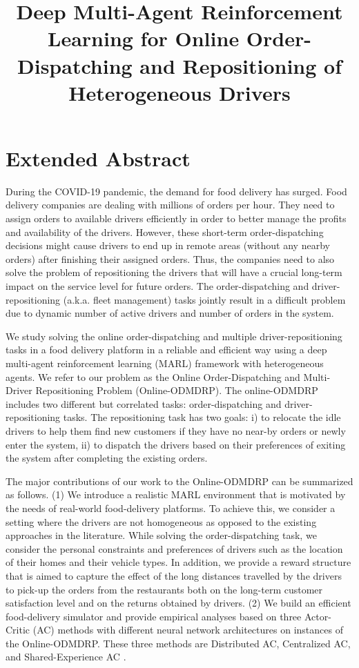 \documentclass{article}
\title{Deep Multi-Agent Reinforcement Learning for Online Order-Dispatching and Repositioning of Heterogeneous Drivers}
\author{\rule{0in}{0pt}
\textbf{Ilgin Dogan}* \hskip 2em \textbf{Yiduo Huang}* \\
University of California, Berkeley\\
* All authors contributed equally. }
\theoremstyle{defn}
\theoremstyle{prop}
\theoremstyle{assm}
\theoremstyle{theoremm}
\theoremstyle{remarkk}
\theoremstyle{lem}
\theoremstyle{example}
\theoremstyle{example}
\begin{document}
\maketitle
\vspace{-0.7cm}
\section*{\centering Extended Abstract}
During the COVID-19 pandemic, the demand for food delivery has surged. Food delivery companies are dealing with millions of orders per hour. They need to assign orders to available drivers efficiently in order to better manage the profits and availability of the drivers. However, these short-term order-dispatching decisions might cause drivers to end up in remote areas (without any nearby orders) after finishing their assigned orders. Thus, the companies need to also solve the problem of repositioning the drivers that will have a crucial long-term impact on the service level for future orders. The order-dispatching and driver-repositioning (a.k.a. fleet management) tasks jointly result in a difficult problem due to dynamic number of active drivers and number of orders in the system. 

We study solving the online order-dispatching and multiple driver-repositioning tasks in a food delivery platform in a reliable and efficient way using a deep multi-agent reinforcement learning (MARL) framework with heterogeneous agents. We refer to our problem as the Online Order-Dispatching and Multi-Driver Repositioning Problem (Online-ODMDRP). The online-ODMDRP includes two different but correlated tasks: order-dispatching and driver-repositioning tasks. The repositioning task has two goals: i) to relocate the idle drivers to help them find new customers if they have no near-by orders or newly enter the system, ii) to dispatch the drivers based on their preferences of exiting the system after completing the existing orders. 

The major contributions of our work to the Online-ODMDRP can be summarized as follows. (1) We introduce a realistic MARL environment that is motivated by the needs of real-world food-delivery platforms. To achieve this, we consider a setting where the drivers are not homogeneous as opposed to the existing approaches in the literature. While solving the order-dispatching task, we consider the personal constraints and preferences of drivers such as the location of their homes and their vehicle types. In addition, we provide a reward structure that is aimed to capture the effect of the long distances travelled by the drivers to pick-up the orders from the restaurants both on the long-term customer satisfaction level and on the returns obtained by drivers. (2) We build an efficient food-delivery simulator and provide empirical analyses based on three Actor-Critic (AC) methods with different neural network architectures on instances of the Online-ODMDRP. These three methods are Distributed AC, Centralized AC, and Shared-Experience AC \citep{christianos2020shared}. 
\end{document}
